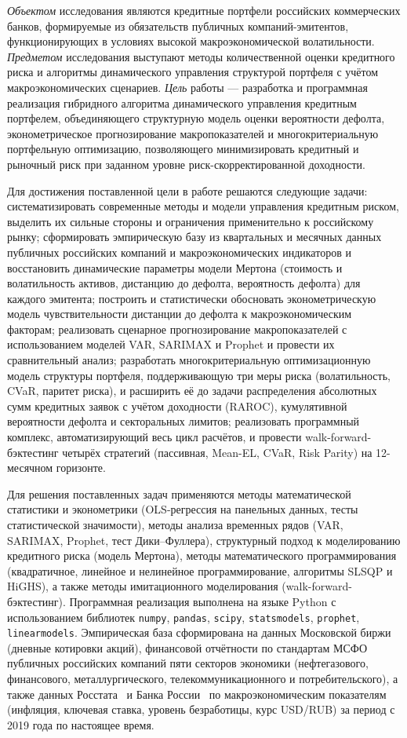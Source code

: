 \documentclass[]{article}
\begin{document}
	\emph{Объектом} исследования являются кредитные портфели российских коммерческих банков,
	формируемые из обязательств публичных компаний-эмитентов, функционирующих в условиях высокой
	макроэкономической волатильности. \emph{Предметом} исследования выступают методы количественной
	оценки кредитного риска и алгоритмы динамического управления структурой портфеля с учётом
	макроэкономических сценариев. \emph{Цель} работы --- разработка и программная реализация
	гибридного алгоритма динамического управления кредитным портфелем, объединяющего структурную
	модель оценки вероятности дефолта, эконометрическое прогнозирование макропоказателей и
	многокритериальную портфельную оптимизацию, позволяющего минимизировать кредитный и рыночный
	риск при заданном уровне риск-скорректированной доходности.

	Для достижения поставленной цели в работе решаются следующие задачи: систематизировать современные
	методы и модели управления кредитным риском, выделить их сильные стороны и ограничения применительно
	к российскому рынку; сформировать эмпирическую базу из квартальных и месячных данных публичных
	российских компаний и макроэкономических индикаторов и восстановить динамические параметры модели
	Мертона (стоимость и волатильность активов, дистанцию до дефолта, вероятность дефолта) для
	каждого эмитента; построить и статистически обосновать эконометрическую модель чувствительности
	дистанции до дефолта к макроэкономическим факторам; реализовать сценарное прогнозирование
	макропоказателей с использованием моделей VAR, SARIMAX и Prophet и провести их
	сравнительный анализ; разработать многокритериальную оптимизационную модель структуры портфеля,
	поддерживающую три меры риска (волатильность, CVaR, паритет риска), и расширить её до задачи
	распределения абсолютных сумм кредитных заявок с учётом доходности (RAROC), кумулятивной
	вероятности дефолта и секторальных лимитов; реализовать программный комплекс, автоматизирующий
	весь цикл расчётов, и провести walk-forward-бэктестинг четырёх стратегий (пассивная, Mean-EL,
	CVaR, Risk Parity) на 12-месячном горизонте.

	Для решения поставленных задач применяются методы математической статистики и эконометрики
	(OLS-регрессия на панельных данных, тесты статистической значимости), методы анализа временных
	рядов (VAR, SARIMAX, Prophet, тест Дики--Фуллера), структурный подход к моделированию
	кредитного риска (модель Мертона), методы математического программирования (квадратичное,
	линейное и нелинейное программирование, алгоритмы SLSQP и HiGHS), а также методы имитационного
	моделирования (walk-forward-бэктестинг). Программная реализация выполнена на языке Python с
	использованием библиотек \texttt{numpy}, \texttt{pandas}, \texttt{scipy}, \texttt{statsmodels},
	\texttt{prophet}, \texttt{linearmodels}. Эмпирическая база сформирована на данных Московской
	биржи (дневные котировки акций), финансовой отчётности по стандартам МСФО публичных российских
	компаний пяти секторов экономики (нефтегазового, финансового, металлургического,
	телекоммуникационного и потребительского), а также данных Росстата~\cite{rosstat} и Банка
	России~\cite{cbr} по макроэкономическим показателям (инфляция, ключевая ставка, уровень
	безработицы, курс USD/RUB) за период с 2019 года по настоящее время.
\end{document}
